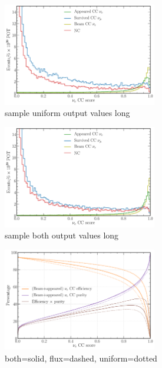 \begin{figure} %
    \includegraphics[width=0.6\textwidth]{diagrams/7-cvn/chipsnet/sample_uniform_output_values.pdf}
    \caption[sample uniform output values short]
    {sample uniform output values long}
    \label{fig:sample_uniform_output_values}
\end{figure}

\begin{figure} %
    \includegraphics[width=0.6\textwidth]{diagrams/7-cvn/chipsnet/sample_both_output_values.pdf}
    \caption[sample both output values short]
    {sample both output values long}
    \label{fig:sample_both_output_values}
\end{figure}

\begin{figure} %
    \includegraphics[width=0.6\textwidth]{diagrams/7-cvn/chipsnet/sample_nuel_eff_curves.pdf}
    \caption[sample nuel eff curves short]
    {both=solid, flux=dashed, uniform=dotted}
    \label{fig:sample_nuel_eff_curves}
\end{figure}

